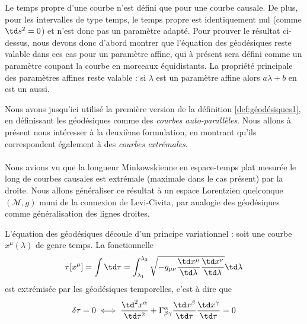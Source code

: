\begin{rmk}
    Le temps propre d'une courbe n'est défini que pour une courbe causale. De plus, pour les intervalles de type temps, le temps propre est identiquement nul (comme $\td s^2 = 0$) et n'est donc pas un paramètre adapté. Pour prouver le résultat ci-dessus, nous devons donc d'abord montrer que l'équation des géodésiques reste valable dans ces cas pour un paramètre affine, qui à présent sera défini comme un paramètre coupant la courbe en morceaux équidistants. La propriété principale des paramètres affines reste valable : si $\lambda$ est un paramètre affine alors $a\lambda +b$ en est un aussi.
\end{rmk}
Nous avons jusqu'ici utilisé la première version de la définition \ref{def:géodésiques1}, en définissant les géodésiques comme des \emph{courbes auto-parallèles}. Nous allons à présent nous intéresser à la deuxième formulation, en montrant qu'ils correspondent également à des \emph{courbes extrémales}. \\
\\
Nous avions vu que la longueur Minkowskienne en espace-temps plat mesurée le long de courbes causales est extrémale (maximale dans le cas présent) par la droite. Nous allons généraliser ce résultat à un espace Lorentzien quelconque $(\mathcal{M},g)$ muni de la connexion de Levi-Civita, par analogie des géodésiques comme généralisation des lignes droites.
\begin{theoremframe}
    \begin{propri}
    L'équation des géodésiques découle d'un principe variationnel : soit une courbe $x^{\mu}(\lambda)$ de genre temps. La fonctionnelle 
    \begin{equation}
        \tau[x^\mu] = \int \td\tau = \int^{\lambda_2}_{\lambda_1}\sqrt{-g_{\mu \nu}\frac{\td x^{\mu}}{\td\lambda}\frac{\td x^{\nu}}{\td\lambda}}\td\lambda
        \label{eq:principe variationnel géodésiques}
        \end{equation}
        est extrémisée par les géodésiques temporelles, c'est à dire que
        \begin{equation}
            \delta \tau = 0 \iff \frac{\td ^2 x^{\alpha}}{\td \tau^2} + \Gamma^{\alpha}_{\beta \gamma}\frac{\td x^{\beta}}{\td \tau}\frac{\td x^{\gamma}}{\td \tau} = 0
        \end{equation}
    \end{propri}
\end{theoremframe}


